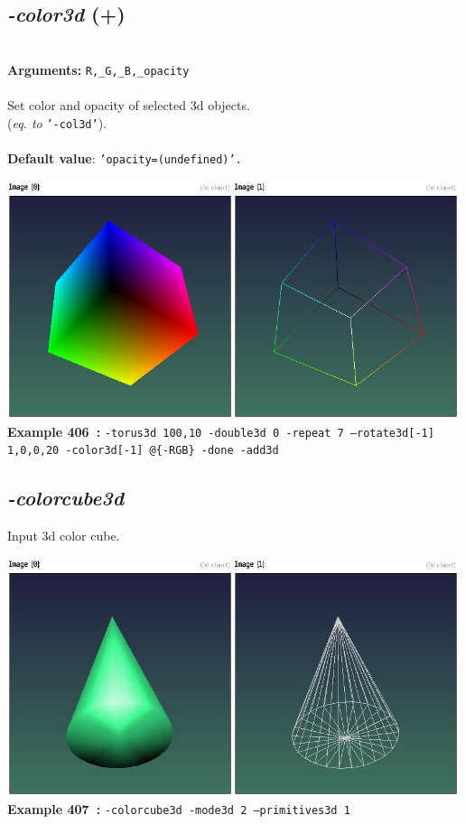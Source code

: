 \documentclass[a4paper,11pt,twoside]{book}
\begin{document}
\subsection{\emph{-color3d} (+)}\vspace*{-0.5em}
~\\\textbf{Arguments: } 
{\small \texttt{R,\_G,\_B,\_opacity}}\\~\\
Set color and opacity of selected 3d objects.
~\\(\emph{eq. to} {\small \texttt{'-col3d'}}).
~\\~\\\textbf{Default value}: {\small \texttt{'opacity=(undefined)'.}}
\begin{center}\includegraphics[keepaspectratio=true,height=7cm,width=\textwidth]{img/gmic_def406.jpg}\\
{\footnotesize \textbf{Example 406~:} \texttt{-torus3d 100,10 -double3d 0 -repeat 7 --rotate3d[-1] 1,0,0,20 -color3d[-1] @\{-RGB\} -done -add3d}}
\end{center}

\subsection{\emph{-colorcube3d} }\vspace*{-0.5em}
Input 3d color cube.
\begin{center}\includegraphics[keepaspectratio=true,height=7cm,width=\textwidth]{img/gmic_def407.jpg}\\
{\footnotesize \textbf{Example 407~:} \texttt{-colorcube3d -mode3d 2 --primitives3d 1}}
\end{center}
\end{document}
